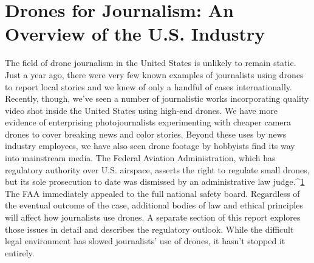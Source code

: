 \section{Drones for Journalism: An Overview of the U.S. Industry}
The field of drone journalism in the United States is unlikely to remain
static. Just a year ago, there were very few known examples of journalists
using drones to report local stories and we knew of only a handful of cases
internationally. Recently, though, we've seen a number of journalistic works
incorporating quality video shot inside the United States using high-end
drones. We have more evidence of enterprising photojournalists experimenting
with cheaper camera drones to cover breaking news and color
stories. Beyond these uses by news industry employees, we have also seen
drone footage by hobbyists find its way into mainstream media.
The Federal Aviation Administration, which has regulatory authority over
U.S. airspace, asserts the right to regulate small drones, but its sole prosecution
to date was dismissed by an administrative law judge.^{\href{#endnotes-industry-overview}{1}} The FAA immediately
appealed to the full national safety board. Regardless of the eventual
outcome of the case, additional bodies of law and ethical principles will
affect how journalists use drones. A separate section of this report explores
those issues in detail and describes the regulatory outlook. While the difficult
legal environment has slowed journalists' use of drones, it hasn't
stopped it entirely.

